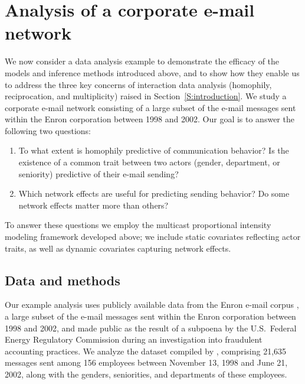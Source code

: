 \documentclass[final]{statsoc}
\begin{document}
\section{Analysis of a corporate e-mail network}\label{S:enron-modeling}

We now consider a data analysis example to demonstrate the efficacy of the models and inference methods introduced above, and to show how they enable us to address the three key concerns of interaction data analysis (homophily, reciprocation, and multiplicity) raised in Section~\ref{S:introduction}.  We study a corporate e-mail network consisting of a large subset of the e-mail messages sent within the Enron corporation between 1998 and 2002.  Our goal is to answer the following two questions:

\begin{enumerate}
    \item To what extent is homophily predictive of communication behavior?  Is the existence of a common trait between two actors (gender, department, or seniority) predictive of their e-mail sending?

    \item Which network effects are useful for predicting sending behavior?  Do some network effects matter more than others?
\end{enumerate}

To answer these questions we employ the multicast proportional intensity modeling framework developed above; we include static covariates reflecting actor traits, as well as dynamic covariates capturing network effects.

\subsection{Data and methods}

\newcommand{\refTemployeesummary}{1} %
Our example analysis uses publicly available data from the Enron e-mail
corpus \citep{cohen2009enron}, a large subset of the e-mail messages sent
within the Enron corporation between 1998 and 2002, and made
public as the result of a subpoena by the U.S.~Federal Energy Regulatory
Commission during an investigation into fraudulent accounting practices.
We analyze the dataset compiled by \citet{zhou2007strategies}, comprising
21,635 messages sent among 156 employees between November 13, 1998 and
June 21, 2002, along with the genders, seniorities, and departments of
these employees.
\end{document}
